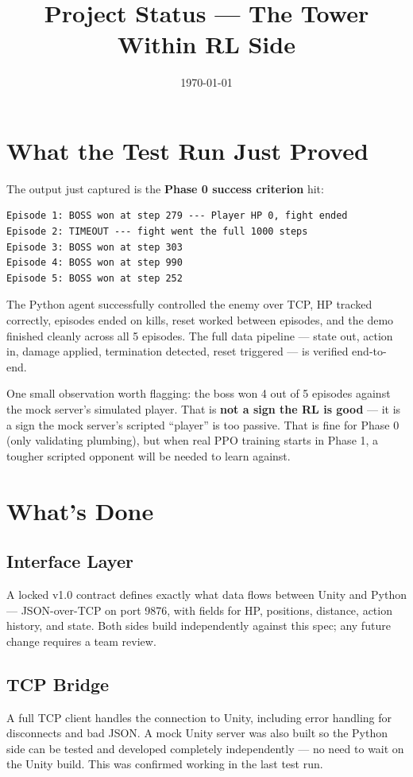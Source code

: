 \documentclass[11pt]{article}
\title{\textbf{Project Status --- The Tower Within RL Side}}
\author{}
\date{\today}
\begin{document}
\maketitle

\section*{What the Test Run Just Proved}

The output just captured is the \textbf{Phase 0 success criterion} hit:

\begin{Verbatim}[frame=single, fontsize=\small]
Episode 1: BOSS won at step 279 --- Player HP 0, fight ended
Episode 2: TIMEOUT --- fight went the full 1000 steps
Episode 3: BOSS won at step 303
Episode 4: BOSS won at step 990
Episode 5: BOSS won at step 252
\end{Verbatim}

The Python agent successfully controlled the enemy over TCP, HP tracked correctly, episodes ended on kills, reset worked between episodes, and the demo finished cleanly across all 5 episodes. The full data pipeline --- state out, action in, damage applied, termination detected, reset triggered --- is verified end-to-end.

One small observation worth flagging: the boss won 4 out of 5 episodes against the mock server's simulated player. That is \textbf{not a sign the RL is good} --- it is a sign the mock server's scripted ``player'' is too passive. That is fine for Phase 0 (only validating plumbing), but when real PPO training starts in Phase 1, a tougher scripted opponent will be needed to learn against.

\section*{What's Done}

\subsection*{Interface Layer}
A locked v1.0 contract defines exactly what data flows between Unity and Python --- JSON-over-TCP on port 9876, with fields for HP, positions, distance, action history, and state. Both sides build independently against this spec; any future change requires a team review.

\subsection*{TCP Bridge}
A full TCP client handles the connection to Unity, including error handling for disconnects and bad JSON. A mock Unity server was also built so the Python side can be tested and developed completely independently --- no need to wait on the Unity build. This was confirmed working in the last test run.
\end{document}
